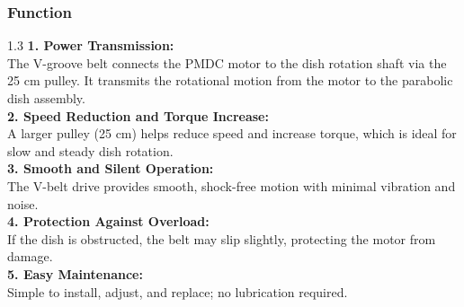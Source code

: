 \subsubsection*{Function}
\vspace{3mm}

\noindent
\begin{spacing}{1.3}
{\fontsize{10.5}{15.5}\selectfont
\textbf{1. Power Transmission:}\\
The V-groove belt connects the PMDC motor to the dish rotation shaft via the 25 cm pulley. It transmits the rotational motion from the motor to the parabolic dish assembly.\\[4mm]
\textbf{2. Speed Reduction and Torque Increase:}\\
A larger pulley (25 cm) helps reduce speed and increase torque, which is ideal for slow and steady dish rotation.\\[4mm]
\textbf{3. Smooth and Silent Operation:}\\
The V-belt drive provides smooth, shock-free motion with minimal vibration and noise.\\[4mm]
\textbf{4. Protection Against Overload:}\\
If the dish is obstructed, the belt may slip slightly, protecting the motor from damage.\\[4mm]
\textbf{5. Easy Maintenance:}\\
Simple to install, adjust, and replace; no lubrication required.
}
\end{spacing}
\clearpage

